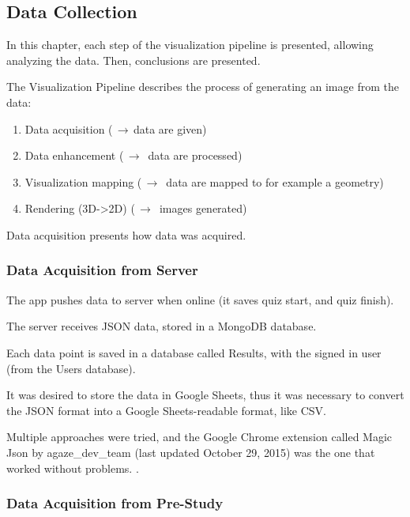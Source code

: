 \subsection{Data Collection}

In this chapter, each step of the visualization pipeline is presented, allowing analyzing the data. Then, conclusions are presented.

The Visualization Pipeline describes the process of generating an image from the data: \cite{timo-ropinski-liu}

\begin{enumerate}
\item Data acquisition ($\,\to\,$data are given)
\item Data enhancement ($\,\to\,$ data are processed)
\item Visualization mapping ($\,\to\,$ data are mapped to for example a geometry)
\item Rendering (3D->2D) ($\,\to\,$ images generated)
\end{enumerate}


Data acquisition presents how data was acquired.

\subsubsection{Data Acquisition from Server}

The app pushes data to server when online (it saves quiz start, and quiz finish).

The server receives JSON data, stored in a MongoDB database.

Each data point is saved in a database called Results, with the signed in user (from the Users database).

It was desired to store the data in Google Sheets, thus it was necessary to convert the JSON format into a Google Sheets-readable format, like CSV.

Multiple approaches were tried, and the Google Chrome extension called Magic Json by agaze\_dev\_team (last updated October 29, 2015) %
was the one that worked without problems. \cite{agaze}.

\subsubsection{Data Acquisition from Pre-Study}

